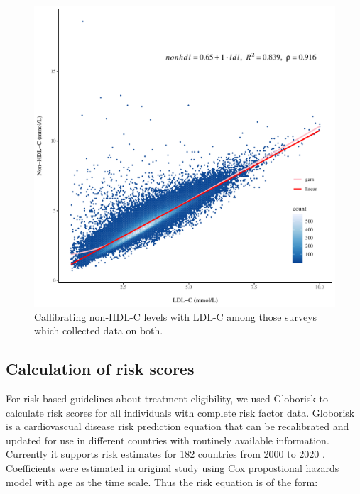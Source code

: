 \documentclass[12pt]{article}
\begin{document}
\begin{appendix}
    \begin{figure}[H]
    \centering
    \includegraphics[width=\textwidth]{../3_figures/figS1_calibration.pdf}
    \caption{Callibrating non-HDL-C levels with LDL-C among those surveys which collected data on both.}
    \label{fig:callibration}
    \end{figure}

    \newpage 

    \subsection{Calculation of risk scores}
    For risk-based guidelines about treatment eligibility, we used Globorisk \cite{hajifathalian_novel_2015} to calculate risk scores for all individuals with complete risk factor data. Globorisk is a cardiovascual disease risk prediction equation that can be recalibrated and updated for use in different countries with routinely available information. Currently it supports risk estimates for 182 countries from 2000 to 2020 \cite{ueda_laboratory-based_2017}. Coefficients were estimated in original study using Cox propostional hazards model with age as the time scale. Thus the risk equation is of the form: 
    

\end{appendix}
\end{document}
